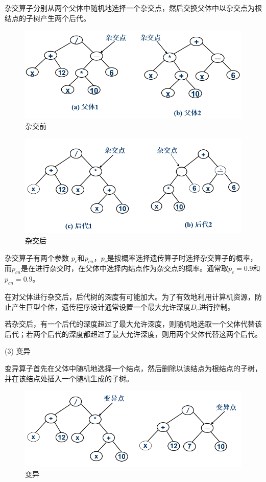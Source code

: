\documentclass[UTF8]{ctexart}
\begin{document}
	杂交算子分别从两个父体中随机地选择一个杂交点，然后交换父体中以杂交点为根结点的子树产生两个后代。
	\begin{figure}[ht]
		\centering	
		\includegraphics[scale=0.25]{images/Hybridization1.png}
		\caption{杂交前}
		\label{fig:label}
	\end{figure}	
	\begin{figure}[ht]
		\centering	
		\includegraphics[scale=0.25]{images/Hybridization2.png}
		\caption{杂交后}
		\label{fig:label}
	\end{figure}

	 杂交算子有两个参数 $p_{c}$和$p_{cn}$，$p_{c}$是按概率选择遗传算子时选择杂交算子的概率，而$p_{cn}$是在进行杂交时，在父体中选择内结点作为杂交点的概率。通常取$p_{c}=0.9$和$p_{cn}=0.9$。
	
	在对父体进行杂交后，后代树的深度有可能加大。为了有效地利用计算机资源，防止产生巨型个体，遗传程序设计通常设置一个最大允许深度$D_{c}$进行控制。
	
	若杂交后，有一个后代的深度超过了最大允许深度，则随机地选取一个父体代替该后代；若两个后代的深度都超过了最大允许深度，则用两个父体代替这两个后代。
	
	(3) 变异
	
	\parindent=19pt
	变异算子首先在父体中随机地选择一个结点，然后删除以该结点为根结点的子树，并在该结点处插入一个随机生成的子树。
	\begin{figure}[ht]
		\centering	
		\includegraphics[scale=0.25]{images/variation.png}
		\caption{变异}
		\label{fig:label}
	\end{figure}
	
\end{document}
